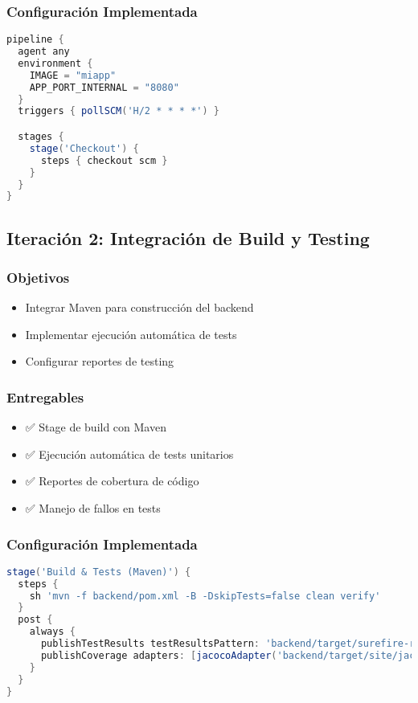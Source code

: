 \documentclass[12pt,a4paper]{article}
\begin{document}
\subsubsection{Configuración Implementada}
\begin{lstlisting}[language=groovy]
pipeline {
  agent any
  environment {
    IMAGE = "miapp"
    APP_PORT_INTERNAL = "8080"
  }
  triggers { pollSCM('H/2 * * * *') }

  stages {
    stage('Checkout') {
      steps { checkout scm }
    }
  }
}
\end{lstlisting}

\subsection{Iteración 2: Integración de Build y Testing}

\subsubsection{Objetivos}
\begin{itemize}
    \item Integrar Maven para construcción del backend
    \item Implementar ejecución automática de tests
    \item Configurar reportes de testing
\end{itemize}

\subsubsection{Entregables}
\begin{itemize}
    \item ✅ Stage de build con Maven
    \item ✅ Ejecución automática de tests unitarios
    \item ✅ Reportes de cobertura de código
    \item ✅ Manejo de fallos en tests
\end{itemize}

\subsubsection{Configuración Implementada}
\begin{lstlisting}[language=groovy]
stage('Build & Tests (Maven)') {
  steps {
    sh 'mvn -f backend/pom.xml -B -DskipTests=false clean verify'
  }
  post {
    always {
      publishTestResults testResultsPattern: 'backend/target/surefire-reports/*.xml'
      publishCoverage adapters: [jacocoAdapter('backend/target/site/jacoco/jacoco.xml')]
    }
  }
}
\end{lstlisting}
\end{document}
